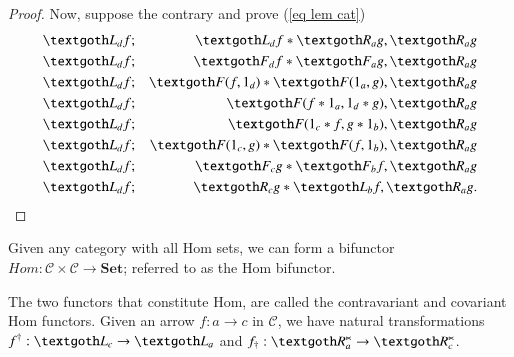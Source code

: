 \documentclass [12pt]{book}
\begin{document}
\begin{proof}
Now, suppose the contrary and prove (\ref{eq lem cat})\begin{eqnarray}\nonumber \textgoth L_df&;&\textgoth L_df*\textgoth R_ag,\textgoth R_ag\\\nonumber \textgoth L_df&;&\textgoth F_df*\textgoth F_ag,\textgoth R_ag\\\nonumber \textgoth L_df&;&\textgoth F(f,1_d)*\textgoth F(1_a,g),\textgoth R_ag\\\nonumber \textgoth L_df&;&\textgoth F(f*1_a,1_d*g),\textgoth R_ag\\\nonumber \textgoth L_df&;&\textgoth F(1_c*f,g*1_b),\textgoth R_ag\\\nonumber \textgoth L_df&;&\textgoth F(1_c,g)*\textgoth F(f,1_b),\textgoth R_ag\\\nonumber \textgoth L_df&;&\textgoth F_cg*\textgoth F_bf,\textgoth R_ag\\\nonumber \textgoth L_df&;&\textgoth R_cg*\textgoth L_bf,\textgoth R_ag.\end{eqnarray}\end{proof}

\begin{theorem}Given any category with all Hom sets, we can form a bifunctor $Hom:\mathcal C\times\mathcal C\rightarrow\textbf{Set}$; referred to as the Hom bifunctor. 

The two functors that constitute Hom, are called the contravariant and covariant Hom functors. Given an arrow $f:a\rightarrow c$ in $\mathcal C$, we have natural transformations $f^\dagger:\textgoth L_c\rightarrow\textgoth L_a$ and $f_\dagger:\textgoth R^\ltimes_a\rightarrow\textgoth R^\ltimes_c$.\end{theorem}
\end{document}
